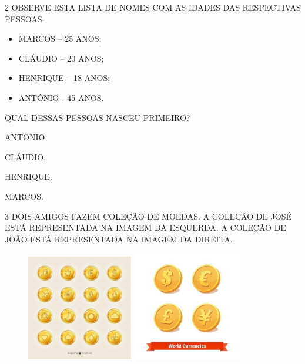 \num{2} OBSERVE ESTA LISTA DE NOMES COM AS IDADES DAS RESPECTIVAS PESSOAS.

\begin{itemize}
  \item MARCOS -- 25 ANOS;
  \item CLÁUDIO -- 20 ANOS;
  \item HENRIQUE -- 18 ANOS;
  \item ANTÔNIO - 45 ANOS.
\end{itemize}

QUAL DESSAS PESSOAS NASCEU PRIMEIRO?

\begin{escolha}
\item ANTÔNIO.

\item CLÁUDIO.

\item HENRIQUE.

\item MARCOS.
\end{escolha}


\num{3} DOIS AMIGOS FAZEM COLEÇÃO DE MOEDAS. A COLEÇÃO DE JOSÉ ESTÁ REPRESENTADA NA IMAGEM DA
ESQUERDA. A COLEÇÃO DE JOÃO ESTÁ REPRESENTADA NA IMAGEM DA DIREITA.


\begin{figure}[htpb!]
\centering
\includegraphics[width=1.82292in,height=1.82292in]{media/image111.jpg}
\includegraphics[width=1.88542in,height=1.88542in]{media/image112.jpg}
\end{figure}

